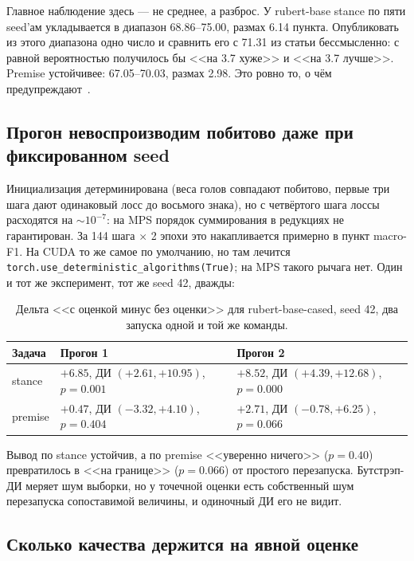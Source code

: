 \documentclass{article}
\begin{document}
Главное наблюдение здесь --- не среднее, а разброс. У rubert-base stance по пяти seed'ам
укладывается в диапазон 68.86--75.00, размах 6.14 пункта. Опубликовать из этого диапазона
одно число и сравнить его с 71.31 из статьи бессмысленно: с равной вероятностью получилось
бы <<на 3.7 хуже>> и <<на 3.7 лучше>>. Premise устойчивее: 67.05--70.03, размах 2.98.
Это ровно то, о чём предупреждают~\cite{dodge2020fine,reimers2017reporting}.

\subsection{Прогон невоспроизводим побитово даже при фиксированном seed}

Инициализация детерминирована (веса голов совпадают побитово, первые три шага дают
одинаковый лосс до восьмого знака), но с четвёртого шага лоссы расходятся на $\sim 10^{-7}$:
на MPS порядок суммирования в редукциях не гарантирован. За 144 шага $\times$ 2 эпохи это
накапливается примерно в пункт macro-F1. На CUDA то же самое по умолчанию, но там лечится
\texttt{torch.use\_deterministic\_algorithms(True)}; на MPS такого рычага нет.
Один и тот же эксперимент, тот же seed 42, дважды:

\begin{table}[!tbh]
\centering
\begin{tabular}{lll}
\toprule
Задача & Прогон 1 & Прогон 2 \\
\midrule
stance  & $+6.85$, ДИ $(+2.61, +10.95)$, $p=0.001$ & $+8.52$, ДИ $(+4.39, +12.68)$, $p=0.000$ \\
premise & $+0.47$, ДИ $(-3.32, +4.10)$, $p=0.404$  & $+2.71$, ДИ $(-0.78, +6.25)$, $p=0.066$ \\
\bottomrule
\end{tabular}
\caption{Дельта <<с оценкой минус без оценки>> для rubert-base-cased, seed 42, два запуска
одной и той же команды.}
\label{tab:nondet}
\end{table}

Вывод по stance устойчив, а по premise <<уверенно ничего>> ($p=0.40$) превратилось
в <<на границе>> ($p=0.066$) от простого перезапуска. Бутстрэп-ДИ меряет шум выборки,
но у точечной оценки есть собственный шум перезапуска сопоставимой величины,
и одиночный ДИ его не видит.

\subsection{Сколько качества держится на явной оценке}
\end{document}
